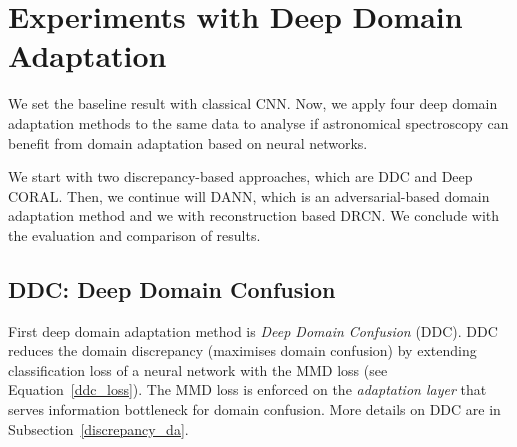 \begin{table}
\begin{center}
\end{center}
\caption[Confusion matrices of the baseline model]{
	Confusion matrices of the baseline model for the source and target validation sets.
	We see the enormeous error on target domain
	where the model predict 937 non-QSOs as QSOs and cannot identify 44 QSOs.
}
\end{table}

\section{Experiments with Deep Domain Adaptation}

We set the baseline result with classical CNN.
Now, we apply four deep domain adaptation methods to the same data
to analyse if astronomical spectroscopy can benefit from domain adaptation
based on neural networks.

We start with two discrepancy-based approaches, which are DDC and Deep CORAL.
Then, we continue will DANN, which is an adversarial-based domain adaptation method
and we with reconstruction based DRCN.
We conclude with the evaluation and comparison of results.

\subsection{DDC: Deep Domain Confusion}

First deep domain adaptation method is \textit{Deep Domain Confusion} (DDC).
DDC reduces the domain discrepancy (maximises domain confusion)
by extending classification loss of a neural network with the MMD loss
(see Equation~\ref{ddc_loss}).
The MMD loss is enforced on the \textit{adaptation layer}
that serves information bottleneck for domain confusion.
More details on DDC are in Subsection~\ref{discrepancy_da}.

